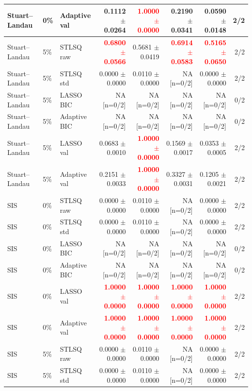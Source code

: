 \documentclass{article}
\begin{document}
\begin{longtable}{lllrrrrr}
Stuart--Landau & 0\% & Adaptive val & 0.1112 $\pm$ 0.0264 & \textcolor{red}{\textbf{1.0000 $\pm$ 0.0000}} & 0.2190 $\pm$ 0.0341 & 0.0590 $\pm$ 0.0148 & 2/2 \\
\midrule
Stuart--Landau & 5\% & STLSQ raw & \textcolor{red}{\textbf{0.6800 $\pm$ 0.0566}} & 0.5681 $\pm$ 0.0419 & \textcolor{red}{\textbf{0.6914 $\pm$ 0.0583}} & \textcolor{red}{\textbf{0.5165 $\pm$ 0.0650}} & 2/2 \\
Stuart--Landau & 5\% & STLSQ std & 0.0000 $\pm$ 0.0000 & 0.0110 $\pm$ 0.0000 & NA [n=0/2] & 0.0000 $\pm$ 0.0000 & 2/2 \\
Stuart--Landau & 5\% & LASSO BIC & NA [n=0/2] & NA [n=0/2] & NA [n=0/2] & NA [n=0/2] & 0/2 \\
Stuart--Landau & 5\% & Adaptive BIC & NA [n=0/2] & NA [n=0/2] & NA [n=0/2] & NA [n=0/2] & 0/2 \\
Stuart--Landau & 5\% & LASSO val & 0.0683 $\pm$ 0.0010 & \textcolor{red}{\textbf{1.0000 $\pm$ 0.0000}} & 0.1569 $\pm$ 0.0017 & 0.0353 $\pm$ 0.0005 & 2/2 \\
Stuart--Landau & 5\% & Adaptive val & 0.2151 $\pm$ 0.0033 & \textcolor{red}{\textbf{1.0000 $\pm$ 0.0000}} & 0.3327 $\pm$ 0.0031 & 0.1205 $\pm$ 0.0021 & 2/2 \\
\midrule
SIS & 0\% & STLSQ raw & 0.0000 $\pm$ 0.0000 & 0.0110 $\pm$ 0.0000 & NA [n=0/2] & 0.0000 $\pm$ 0.0000 & 2/2 \\
SIS & 0\% & STLSQ std & 0.0000 $\pm$ 0.0000 & 0.0110 $\pm$ 0.0000 & NA [n=0/2] & 0.0000 $\pm$ 0.0000 & 2/2 \\
SIS & 0\% & LASSO BIC & NA [n=0/2] & NA [n=0/2] & NA [n=0/2] & NA [n=0/2] & 0/2 \\
SIS & 0\% & Adaptive BIC & NA [n=0/2] & NA [n=0/2] & NA [n=0/2] & NA [n=0/2] & 0/2 \\
SIS & 0\% & LASSO val & \textcolor{red}{\textbf{1.0000 $\pm$ 0.0000}} & \textcolor{red}{\textbf{1.0000 $\pm$ 0.0000}} & \textcolor{red}{\textbf{1.0000 $\pm$ 0.0000}} & \textcolor{red}{\textbf{1.0000 $\pm$ 0.0000}} & 2/2 \\
SIS & 0\% & Adaptive val & \textcolor{red}{\textbf{1.0000 $\pm$ 0.0000}} & \textcolor{red}{\textbf{1.0000 $\pm$ 0.0000}} & \textcolor{red}{\textbf{1.0000 $\pm$ 0.0000}} & \textcolor{red}{\textbf{1.0000 $\pm$ 0.0000}} & 2/2 \\
\midrule
SIS & 5\% & STLSQ raw & 0.0000 $\pm$ 0.0000 & 0.0110 $\pm$ 0.0000 & NA [n=0/2] & 0.0000 $\pm$ 0.0000 & 2/2 \\
SIS & 5\% & STLSQ std & 0.0000 $\pm$ 0.0000 & 0.0110 $\pm$ 0.0000 & NA [n=0/2] & 0.0000 $\pm$ 0.0000 & 2/2 \\

\end{longtable}
\end{document}

